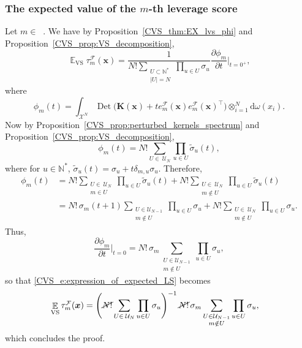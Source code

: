 \documentclass[twoside,11pt]{book}
\numberwithin{theorem}{chapter}
\numberwithin{definition}{chapter}
\numberwithin{proposition}{chapter}
\numberwithin{corollary}{chapter}
\numberwithin{example}{chapter}
\numberwithin{lemma}{chapter}
\numberwithin{assumption}{chapter}
\numberwithin{equation}{chapter}
\numberwithin{figure}{chapter}
\DeclareMathOperator{\Det}{Det}
\DeclareMathOperator{\VS}{\mathrm{VS}}
\DeclareMathOperator{\Tran}{\intercal}
\DeclareMathOperator{\EX}{\mathbb{E}}
\DeclareMathOperator{\F}{\mathcal{F}}
\DeclareMathOperator{\Ns}{\mathbb{N}^{*}}
\def\UN{\:\mathcal{U}_N}
\begin{document}
\subsubsection{The expected value of the $m$-th leverage score}
Let $m \in \Ns$. We have by Proposition~\ref{CVS_thm:EX_lvs_phi} and Proposition~\ref{CVS_prop:VS_decomposition},
\begin{equation}
\EX_{\VS} \tau_{m}^{\F}(\bm{x})  = \frac{1}{N!\sum\limits_{\substack{U \subset \mathbb{N}^{*}\\ |U| = N}} \prod\limits_{u \in U}\sigma_{u}}  \frac{\partial \phi_{m}}{ \partial t }|_{t = 0^{+}},
\label{CVS_e:expression_of_expected_LS}\end{equation}
where
\begin{equation}
\phi_{m}(t) = \int_{\mathcal{X}^{N}} \Det \bigg(\bm{K}(\bm{x})+t e_{m}^{\mathcal{F}}(\bm{x})e_{m}^{\mathcal{F}}(\bm{x})^{\Tran} \bigg) \otimes_{i =1}^{N} \mathrm{d}\omega(x_{i}).
\end{equation}
Now by Proposition~\ref{CVS_prop:perturbed_kernels_spectrum} and Proposition~\ref{CVS_prop:VS_decomposition},
\begin{equation}
\phi_{m}(t) = N! \sum\limits_{U\in\UN} \prod\limits_{u \in U} \tilde{\sigma}_{u}(t),
\end{equation}
where for $u \in \mathbb{N}^{*}$, $\tilde{\sigma}_{u}(t) = \sigma_{u} + t\delta_{m,u}\sigma_{u}$.
Therefore,
\begin{align}
\phi_{m}(t) & = N!\sum\limits_{\substack{U \in\UN \\ m \in U}} \prod\limits_{u \in U} \tilde{\sigma}_{u}(t) + N!\sum\limits_{\substack{U \in\UN \\ m \notin U}} \prod\limits_{u \in U} \tilde{\sigma}_{u}(t) \\
& = N!\,\sigma_{m}(t+1)\sum\limits_{\substack{U\in \mathcal{U}_{N-1}\\ m \notin U}} \prod\limits_{u \in U} \sigma_{u} + N!\sum\limits_{\substack{U \in\UN \\ m \notin U}} \prod\limits_{u \in U} \sigma_{u}.
\end{align}
Thus,  
\begin{equation}
\frac{\partial \phi_{m}}{\partial t}|_{t = 0} = N!\,\sigma_{m}\sum\limits_{\substack{U\in \mathcal{U}_{N-1}\\ m \notin U}} \prod\limits_{u \in U} \sigma_{u},
\end{equation}
so that \eqref{CVS_e:expression_of_expected_LS} becomes
\begin{align}
\EX_{\VS} \tau_{m}^{\F}(\bm{x}) & = \left(\cancel{N!}\sum\limits_{U\in\UN}\prod\limits_{u \in U}\sigma_{u} \right)^{-1} \cancel{N!}\,\sigma_{m}\sum\limits_{\substack{U\in \mathcal{U}_{N-1}\\ m \notin U}} \prod\limits_{u \in U} \sigma_{u},
\end{align}
which concludes the proof.
\end{document}
